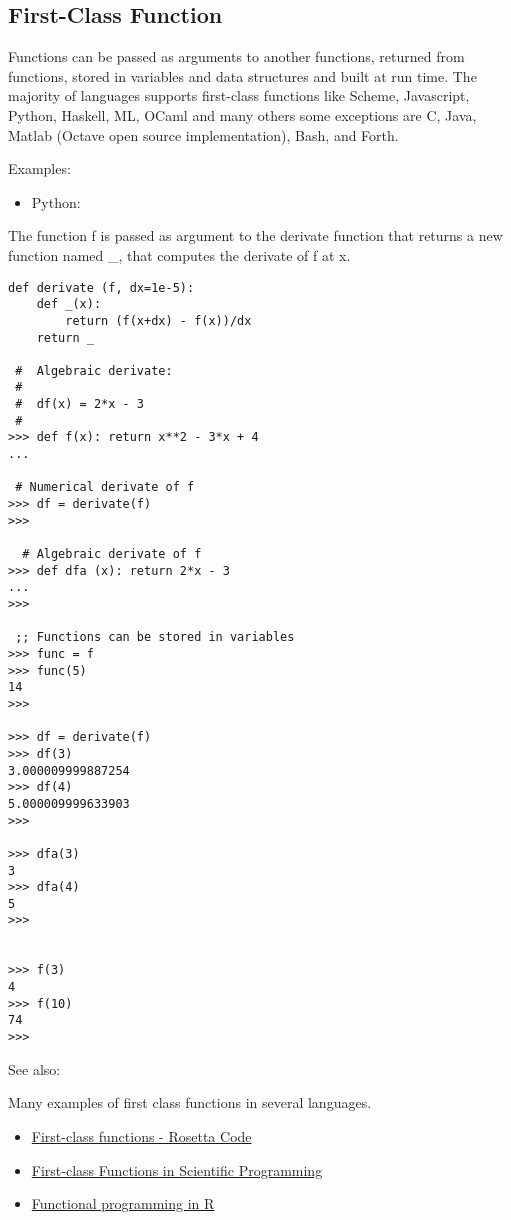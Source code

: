 \documentclass[11pt]{article}
\begin{document}
\subsection{First-Class Function}
\label{sec-1-3}

Functions can be passed as arguments to another functions, returned
from functions, stored in variables and data structures and built at
run time. The majority of languages supports first-class functions
like Scheme, Javascript, Python, Haskell, ML, OCaml and many others
some exceptions are C, Java, Matlab (Octave open source
implementation), Bash, and Forth.

Examples:

\begin{itemize}
\item Python:
\end{itemize}

The function f is passed as argument to the derivate function that
returns a new function named \_, that computes the derivate of f at x.

\begin{verbatim}
def derivate (f, dx=1e-5):
    def _(x):
        return (f(x+dx) - f(x))/dx
    return _
    
 #  Algebraic derivate:
 #
 #  df(x) = 2*x - 3
 #    
>>> def f(x): return x**2 - 3*x + 4
... 

 # Numerical derivate of f
>>> df = derivate(f)
>>> 

  # Algebraic derivate of f
>>> def dfa (x): return 2*x - 3
... 
>>> 

 ;; Functions can be stored in variables
>>> func = f
>>> func(5)
14
>>> 

>>> df = derivate(f)
>>> df(3)
3.000009999887254
>>> df(4)
5.000009999633903
>>> 

>>> dfa(3)
3
>>> dfa(4)
5
>>> 


>>> f(3)
4
>>> f(10)
74
>>>
\end{verbatim}

See also: 

Many examples of first class functions in several languages. 

\begin{itemize}
\item \href{http://rosettacode.org/wiki/First-class_functions#C}{First-class functions - Rosetta Code}

\item \href{http://slidegur.com/doc/1814324/first-class-functions-in-scientific-programming}{First-class Functions in Scientific Programming}

\item \href{http://adv-r.had.co.nz/Functional-programming.html}{Functional programming in R}
\end{itemize}
\end{document}
